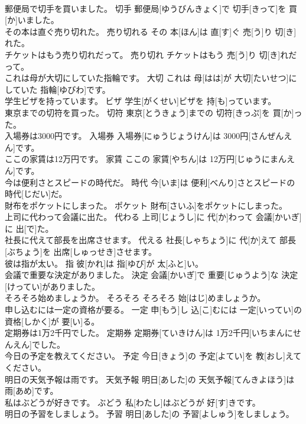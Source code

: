 \documentclass[8pt]{extreport}
\begin{document}
\begin{CJK}{UTF8}{min}
\\	郵便局で切手を買いました。	切手	郵便局[ゆうびんきょく]で 切手[きって]を 買[か]いました。	
\\	その本は直ぐ売り切れた。	売り切れる	その 本[ほん]は 直[す]ぐ 売[う]り 切[き]れた。	
\\	チケットはもう売り切れだって。	売り切れ	チケットはもう 売[う]り 切[き]れだって。	
\\	これは母が大切にしていた指輪です。	大切	これは 母[はは]が 大切[たいせつ]にしていた 指輪[ゆびわ]です。	
\\	学生ビザを持っています。	ビザ	学生[がくせい]ビザを 持[も]っています。	
\\	東京までの切符を買った。	切符	東京[とうきょう]までの 切符[きっぷ]を 買[か]った。	
\\	入場券は3000円です。	入場券	入場券[にゅうじょうけん]は 3000円[さんぜんえん]です。	
\\	ここの家賃は12万円です。	家賃	ここの 家賃[やちん]は 12万円[じゅうにまんえん]です。	
\\	今は便利さとスピードの時代だ。	時代	今[いま]は 便利[べんり]さとスピードの 時代[じだい]だ。	
\\	財布をポケットにしまった。	ポケット	財布[さいふ]をポケットにしまった。	
\\	上司に代わって会議に出た。	代わる	上司[じょうし]に 代[か]わって 会議[かいぎ]に 出[で]た。	
\\	社長に代えて部長を出席させます。	代える	社長[しゃちょう]に 代[か]えて 部長[ぶちょう]を 出席[しゅっせき]させます。	
\\	彼は指が太い。	指	彼[かれ]は 指[ゆび]が 太[ふと]い。	
\\	会議で重要な決定がありました。	決定	会議[かいぎ]で 重要[じゅうよう]な 決定[けってい]がありました。	
\\	そろそろ始めましょうか。	そろそろ	そろそろ 始[はじ]めましょうか。	
\\	申し込むには一定の資格が要る。	一定	申[もう]し 込[こ]むには 一定[いってい]の 資格[しかく]が 要[い]る。	
\\	定期券は1万2千円でした。	定期券	定期券[ていきけん]は 1万2千円[いちまんにせんえん]でした。	
\\	今日の予定を教えてください。	予定	今日[きょう]の 予定[よてい]を 教[おし]えてください。	
\\	明日の天気予報は雨です。	天気予報	明日[あした]の 天気予報[てんきよほう]は 雨[あめ]です。	
\\	私はぶどうが好きです。	ぶどう	私[わたし]はぶどうが 好[す]きです。	
\\	明日の予習をしましょう。	予習	明日[あした]の 予習[よしゅう]をしましょう。	

\end{CJK}
\end{document}
